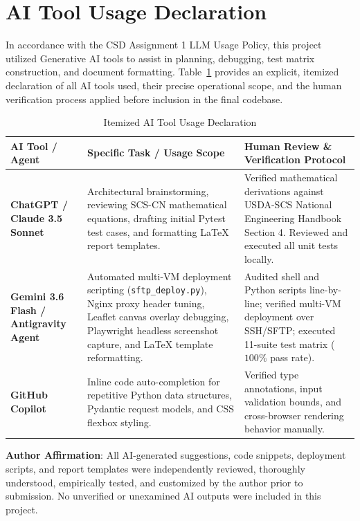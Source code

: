 \documentclass[manuscript,screen]{acmart}
\begin{document}
\section{AI Tool Usage Declaration}
\label{sec:ai-usage}
In accordance with the CSD Assignment 1 LLM Usage Policy, this project utilized Generative AI tools to assist in planning, debugging, test matrix construction, and document formatting. Table~\ref{tab:ai-usage} provides an explicit, itemized declaration of all AI tools used, their precise operational scope, and the human verification process applied before inclusion in the final codebase.

\begin{table}[h]
  \caption{Itemized AI Tool Usage Declaration}
  \label{tab:ai-usage}
  \begin{tabular}{p{3.0cm}p{4.2cm}p{6.0cm}}
    \toprule
    AI Tool / Agent & Specific Task / Usage Scope & Human Review \& Verification Protocol \\
    \midrule
    \textbf{ChatGPT / Claude 3.5 Sonnet} & Architectural brainstorming, reviewing SCS-CN mathematical equations, drafting initial Pytest test cases, and formatting LaTeX report templates. & Verified mathematical derivations against USDA-SCS National Engineering Handbook Section 4. Reviewed and executed all unit tests locally. \\
    \textbf{Gemini 3.6 Flash / Antigravity Agent} & Automated multi-VM deployment scripting (\texttt{sftp\_deploy.py}), Nginx proxy header tuning, Leaflet canvas overlay debugging, Playwright headless screenshot capture, and LaTeX template reformatting. & Audited shell and Python scripts line-by-line; verified multi-VM deployment over SSH/SFTP; executed 11-suite test matrix ($100\%$ pass rate). \\
    \textbf{GitHub Copilot} & Inline code auto-completion for repetitive Python data structures, Pydantic request models, and CSS flexbox styling. & Verified type annotations, input validation bounds, and cross-browser rendering behavior manually. \\
    \bottomrule
  \end{tabular}
\end{table}

\textbf{Author Affirmation}: All AI-generated suggestions, code snippets, deployment scripts, and report templates were independently reviewed, thoroughly understood, empirically tested, and customized by the author prior to submission. No unverified or unexamined AI outputs were included in this project.
\end{document}
